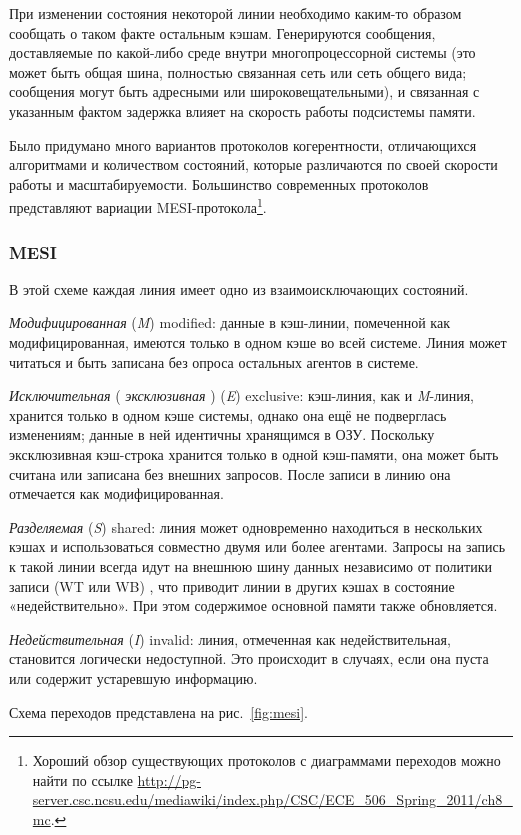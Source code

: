 При изменении состояния некоторой линии необходимо каким-то образом сообщать о таком факте остальным кэшам. Генерируются сообщения, доставляемые по какой-либо среде внутри многопроцессорной системы (это может быть общая шина, полностью связанная сеть или сеть общего вида; сообщения могут быть адресными или широковещательными), и связанная с указанным фактом задержка влияет на скорость работы подсистемы памяти.

Было придумано много вариантов протоколов когерентности, отличающихся алгоритмами и количеством состояний, которые различаются по своей скорости работы и масштабируемости. Большинство современных протоколов представляют вариации MESI-протокола\footnote{Хороший обзор существующих протоколов с диаграммами переходов можно найти по ссылке \url{http://pg-server.csc.ncsu.edu/mediawiki/index.php/CSC/ECE_506_Spring_2011/ch8_mc}.}.

\subsubsection{MESI}

В этой схеме каждая линия имеет одно из взаимоисключающих состояний.

\begin{itemize*}
\item    \textit{Модифицированная} (\textit{M}) \abbr modified: данные в кэш-линии, помеченной как модифицированная, имеются только в одном кэше во всей системе. Линия может читаться и быть записана без опроса остальных агентов в системе.

\item    \textit{Исключительная} ( \textit{эксклюзивная} ) (\textit{E}) \abbr exclusive: кэш-линия, как и \textit{M}-линия, хранится только в одном кэше системы, однако она ещё не подверглась изменениям; данные в ней идентичны хранящимся в ОЗУ. Поскольку эксклюзивная кэш-строка хранится только в одной кэш-памяти, она может быть считана или записана без внешних запросов. После записи в линию она отмечается как модифицированная.

\item    \textit{Разделяемая} (\textit{S}) \abbr shared: линия может одновременно находиться в нес\-коль\-ких кэшах и использоваться совместно двумя или более агентами. Запросы на запись к такой линии  всегда идут на внешнюю шину данных независимо от политики записи (WT или WB) , что приводит линии в других кэшах в состояние «недействительно». При этом содержимое основной памяти также обновляется.

\item    \textit{Недействительная} (\textit{I}) \abbr invalid: линия, отмеченная как недействительная, становится логически недоступной. Это происходит в случаях, если она пуста или содержит устаревшую информацию. 

\end{itemize*}
Схема переходов представлена на рис.~\ref{fig:mesi}.

